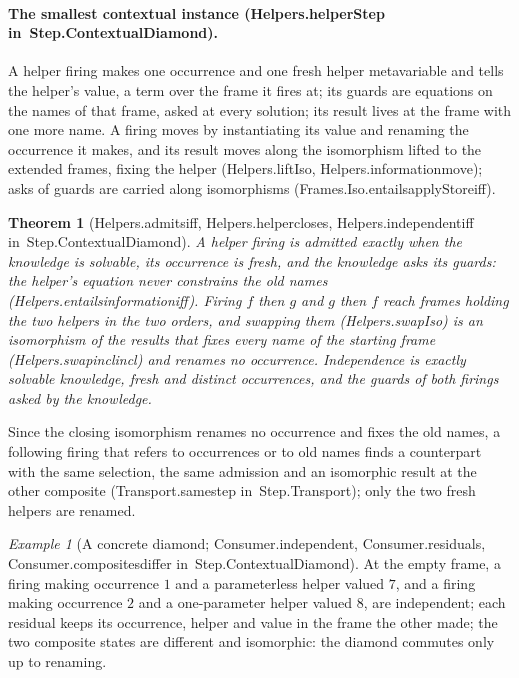 \documentclass[11pt]{article}
\newtheorem{theorem}{Theorem}
\theoremstyle{remark}
\newtheorem{example}{Example}
\newcommand{\lean}[1]{{\ttfamily\def\_{\textunderscore\allowbreak}#1}}
\newcommand{\inmod}[1]{in~{\ttfamily\def\_{\textunderscore\allowbreak}#1}}
\begin{document}
\paragraph{The smallest contextual instance (\lean{Helpers.helperStep} \inmod{Step.ContextualDiamond}).} A
helper firing makes one occurrence and one fresh helper metavariable and tells the helper's value, a
term over the frame it fires at; its guards are equations on the names of that frame, asked at every
solution; its result lives at the frame with one more name. A firing moves by instantiating its value
and renaming the occurrence it makes, and its result moves along the isomorphism lifted to the extended
frames, fixing the helper (\lean{Helpers.liftIso}, \lean{Helpers.information\_move}); asks of guards are
carried along isomorphisms (\lean{Frames.Iso.entails\_applyStore\_iff}).
\begin{theorem}[\lean{Helpers.admits\_iff}, \lean{Helpers.helper\_closes}, \lean{Helpers.independent\_iff} \inmod{Step.ContextualDiamond}]
A helper firing is admitted exactly when the knowledge is solvable, its occurrence is fresh, and the
knowledge asks its guards: the helper's equation never constrains the old names
(\lean{Helpers.entails\_information\_iff}). Firing $f$ then $g$ and $g$ then $f$ reach frames holding the
two helpers in the two orders, and swapping them (\lean{Helpers.swapIso}) is an isomorphism of the
results that fixes every name of the starting frame (\lean{Helpers.swap\_incl\_incl}) and renames no
occurrence. Independence is exactly solvable knowledge, fresh and distinct occurrences, and the guards
of both firings asked by the knowledge.
\end{theorem}
Since the closing isomorphism renames no occurrence and fixes the old names, a following firing that
refers to occurrences or to old names finds a counterpart with the same selection, the same admission
and an isomorphic result at the other composite (\lean{Transport.same\_step} \inmod{Step.Transport}); only the two fresh helpers
are renamed.
\begin{example}[A concrete diamond; \lean{Consumer.independent}, \lean{Consumer.residuals}, \lean{Consumer.composites\_differ} \inmod{Step.ContextualDiamond}]
At the empty frame, a firing making occurrence $1$ and a parameterless helper valued $7$, and a firing
making occurrence $2$ and a one-parameter helper valued $8$, are independent; each residual keeps its
occurrence, helper and value in the frame the other made; the two composite states are different and
isomorphic: the diamond commutes only up to renaming.
\end{example}
\end{document}
